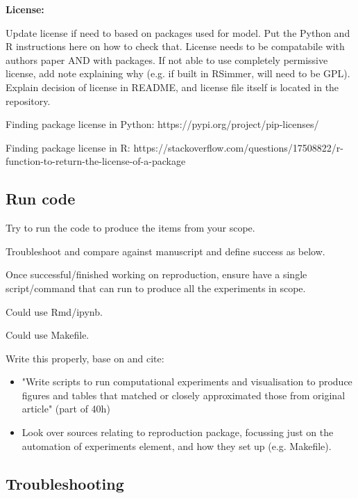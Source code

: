 \textbf{License:}

Update license if need to based on packages used for model. Put the Python and R instructions here on how to check that. License needs to be compatabile with authors paper AND with packages. If not able to use completely permissive license, add note explaining why (e.g. if built in RSimmer, will need to be GPL). Explain decision of license in README, and license file itself is located in the repository.

Finding package license in Python: https://pypi.org/project/pip-licenses/

Finding package license in R: https://stackoverflow.com/questions/17508822/r-function-to-return-the-license-of-a-package 

\subsection{Run code}


Try to run the code to produce the items from your scope.

Troubleshoot and compare against manuscript and define success as below.

Once successful/finished working on reproduction, ensure have a single script/command that can run to produce all the experiments in scope.

Could use Rmd/ipynb.

Could use Makefile.

Write this properly, base on and cite:
\begin{itemize}
    \item "Write scripts to run computational experiments and visualisation to produce figures and tables that matched or closely approximated those from original article" (part of 40h)\autocite{krafczyk_learning_2021}
    \item Look over sources relating to reproduction package, focussing just on the automation of experiments element, and how they set up (e.g. Makefile).
\end{itemize}

\subsection{Troubleshooting}

